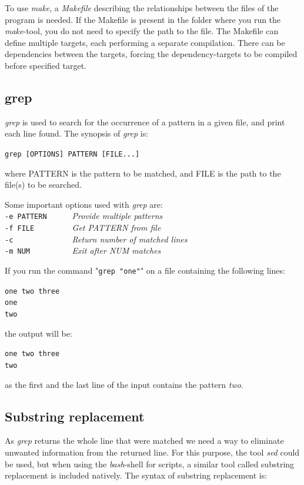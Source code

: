 To use \textit{make}, a \textit{Makefile} describing the relationships between the files of the program is needed. If the Makefile is present in the folder where you run the \textit{make}-tool, you do not need to specify the path to the file. The Makefile can define multiple targets, each performing a separate compilation. There can be dependencies between the targets, forcing the dependency-targets to be compiled before specified target.
\subsection{grep}
\textit{grep} is used to search for the occurrence of a pattern in a given file, and print each line found. The synopsis of \textit{grep} is:

\verb!grep [OPTIONS] PATTERN [FILE...]!

where PATTERN is the pattern to be matched, and FILE is the path to the file(s) to be searched.

Some important options used with \textit{grep} are:\\
\verb!-e PATTERN      !\textit{Provide multiple patterns}\\
\verb!-f FILE         !\textit{Get PATTERN from file}\\
\verb!-c              !\textit{Return number of matched lines}\\
\verb!-m NUM          !\textit{Exit after NUM matches}

If you run the command "\verb!grep "one"!" on a file containing the following lines:

\verb!one two three!\\
\verb!one!\\
\verb!two!

the output will be:

\verb!one two three!\\
\verb!two!

as the first and the last line of the input contains the pattern \textit{two}.

\subsection{Substring replacement}

As \textit{grep} returns the whole line that were matched we need a way to eliminate unwanted information from the returned line. For this purpose, the tool \textit{sed} could be used, but when using the \textit{bash}-shell for scripts, a similar tool called substring replacement is included natively. The syntax of substring replacement is:


